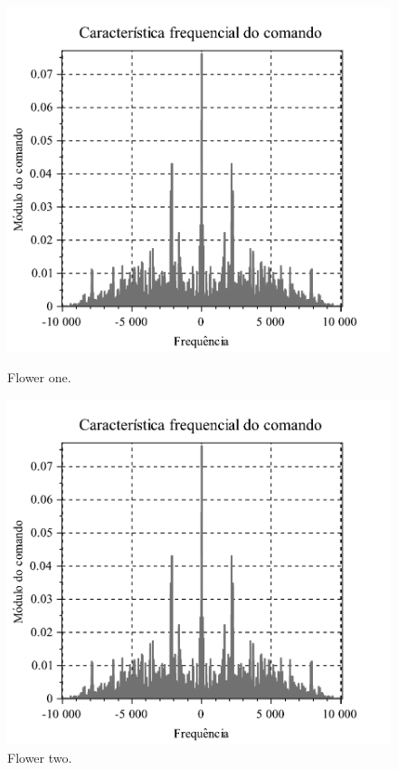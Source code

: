 \documentclass{article}
\begin{document}
\begin{figure}[!h]
  \centering
  \begin{minipage}[b]{0.4\textwidth}
    \includegraphics[width=\textwidth]{figures/Freq_Com.pdf}
    \caption{Flower one.}
  \end{minipage}
  \hfill
  \begin{minipage}[b]{0.4\textwidth}
    \includegraphics[width=\textwidth]{figures/Freq_Com.pdf}
    \caption{Flower two.}
  \end{minipage}
\end{figure}
\end{document}
